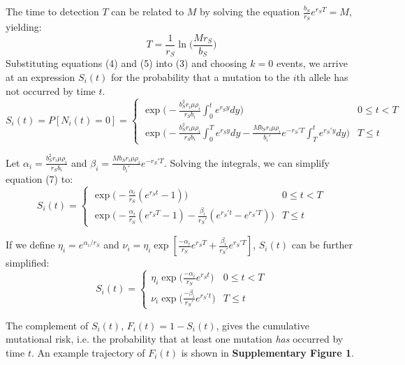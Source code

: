 \documentclass{article}
\begin{document}
The time to detection $T$ can be related to $M$ by solving the equation $\frac{b_S}{r_S}e^{r_ST}=M$, yielding:
\begin{equation}
T=\frac{1}{r_S}\ln\Big(\frac{Mr_S}{b_S}\Big)
\end{equation}
Substituting equations (4) and (5) into (3) and choosing $k=0$ events, we arrive at an expression $S_i(t)$ for the probability that a mutation to the $i$th allele has not occurred by time $t$.
\begin{equation}
S_i(t)=P[N_i(t)=0]  = \begin{cases} 
          \exp\Big(-\frac{b_S^2 r_i \mu \rho_i}{r_S b_i}\int_0^t e^{r_S y}dy\Big) & 0\leq t < T \\
          \exp\Big(-\frac{b_S^2 r_i \mu \rho_i}{r_S b_i}\int_0^T e^{r_S y}dy - \frac{M b_S r_i \mu \rho_i}{b_i'}e^{-r_S' T}\int_T^t e^{r_S'y}dy\Big) & T\leq t
       \end{cases}
\end{equation}

Let $\alpha_i = \frac{b_S^2 r_i \mu \rho_i}{r_S b_i}$ and $\beta_i = \frac{M b_S r_i \mu \rho_i}{b_i'}e^{-r_S' T}$.  Solving the integrals, we can simplify equation (7) to:
\begin{equation}
S_i(t)= \begin{cases} 
          \exp\Big(-\frac{\alpha_i}{r_S} (e^{r_S t}-1)\Big) & 0\leq t < T \\
          \exp\Big(-\frac{\alpha_i}{r_S} (e^{r_S T}-1) - \frac{\beta_i}{r_S'} (e^{r_S't}-e^{r_S'T})\Big) & T\leq t
       \end{cases}
\end{equation}

If we define $\eta_i = e^{\alpha_i /r_S}$ and $\nu_i = \eta_i \exp[\frac{-\alpha_i}{r_S} e^{r_S T}+\frac{\beta_i}{r_S'}e^{r_S' T}]$, $S_i(t)$ can be further simplified: 
\begin{equation}
S_i(t)= \begin{cases} 
		\eta_i \exp\Big(\frac{-\alpha_i}{r_S} e^{r_S t}\Big) & 0\leq t < T \\
		\nu_i \exp\Big(\frac{-\beta_i}{r_S'} e^{r_S' t}\Big) & T\leq t
       \end{cases}
\end{equation}


The complement of $S_i(t)$, $F_i(t)=1-S_i(t)$, gives the cumulative mutational risk, i.e. the probability that at least one mutation \textit{has} occurred by time $t$.  An example trajectory of $F_i(t)$ is shown in \textbf{Supplementary Figure 1}.
\end{document}
